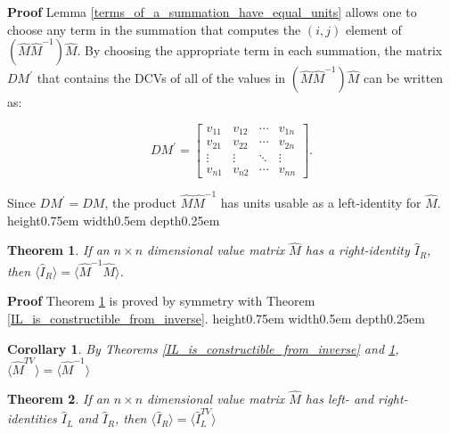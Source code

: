 \documentclass[10pt,letterpaper]{article}
\newtheorem{thm}{Theorem}[section]
\newtheorem{cor}{Corollary}[section]
\newenvironment{proof}{\noindent\textbf{Proof} }{\qed \newline}
\newcommand{\qed}{\nobreak \ifvmode \relax \else
      \ifdim\lastskip<1.5em \hskip-\lastskip
      \hskip1.5em plus0em minus0.5em \fi \nobreak
      \vrule height0.75em width0.5em depth0.25em\fi}
\numberwithin{equation}{section}
\begin{document}
\begin{proof}
Lemma \ref{terms_of_a_summation_have_equal_units} allows one to choose
any term in the summation that computes the $(i, j)$ element of $(\hat
M \hat M^{-1}) \hat M$.  By choosing the appropriate term in each
summation, the matrix $DM^{\prime}$ that contains the DCVs of all of
the values in $(\hat M \hat M^{-1}) \hat M$ can be written as:

\[ DM^{\prime} = \left[ \begin{matrix} 
  v_{11} & v_{12} & \cdots & v_{1n} \\
  v_{21} & v_{22} & \cdots & v_{2n} \\
  \vdots & \vdots & \ddots & \vdots \\
  v_{n1} & v_{n2} & \cdots & v_{nn}
\end{matrix} \right]. \]

Since $DM^{\prime} = DM$, the product $\hat M \hat M^{-1}$
has units usable as a left-identity for $\hat M$. \end{proof}

\begin{thm} \label{IR_is_constructible_from_inverse} If an $n \times n$
dimensional value matrix $\hat M$ has a right-identity $\hat I_R$,
then $\langle \hat I_R \rangle = \langle \hat M^{-1} \hat M
\rangle$. \end{thm}

\begin{proof}Theorem \ref{IR_is_constructible_from_inverse} is proved
by symmetry with Theorem \ref{IL_is_constructible_from_inverse}. \end{proof}

\begin{cor}By Theorems \ref{IL_is_constructible_from_inverse} and
\ref{IR_is_constructible_from_inverse}, $\langle \hat M^{TV}
\rangle = \langle \hat M^{-1} \rangle$ \end{cor}

\begin{thm}If an $n \times n$ dimensional value matrix $\hat M$ has
left- and right-identities $\hat I_L$ and $\hat I_R$, then
$\langle \hat I_R \rangle = \langle \hat I_L^{TV} \rangle$ \end{thm}
\end{document}
